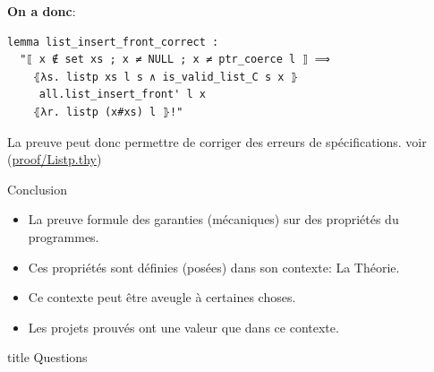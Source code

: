 \documentclass[hyperref={pdfpagelabels=false}]{beamer}
\begin{document}
\begin{frame}[fragile]
\textbf{On a donc}:
  \begin{center}
    \begin{minipage}{0.8\textwidth}
      \begin{lstlisting}
lemma list_insert_front_correct :
  "⟦ x ∉ set xs ; x ≠ NULL ; x ≠ ptr_coerce l ⟧ ⟹
    ⦃λs. listp xs l s ∧ is_valid_list_C s x ⦄
     all.list_insert_front' l x
    ⦃λr. listp (x#xs) l ⦄!"
       \end{lstlisting}
    \end{minipage}
  \end{center}
  La preuve peut donc permettre de corriger des erreurs de spécifications.
  \vfill
  \hfill
  {\tiny voir (\url{proof/Listp.thy})}
\end{frame}


\begin{frame}{Conclusion}
  \begin{itemize}
    \item La preuve formule des garanties (mécaniques) sur des propriétés du programmes.
    \item Ces propriétés sont définies (posées) dans son contexte: La Théorie.
    \item Ce contexte peut être aveugle à certaines choses.
    \item Les projets prouvés ont une valeur que dans ce contexte.
  \end{itemize}
\end{frame}

\begin{frame}[fragile]
  \vfill
  \centering
  \begin{beamercolorbox}[sep=8pt,center,shadow=true,rounded=true]{title}
    Questions\par%
  \end{beamercolorbox}
\end{frame}
\end{document}
